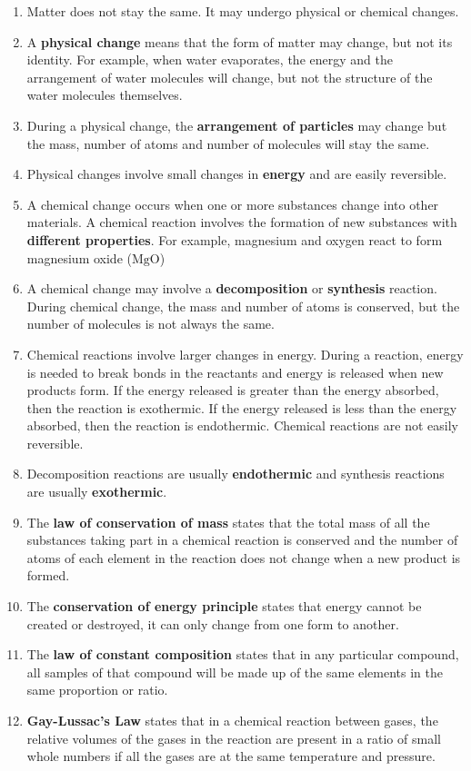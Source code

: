       \label{m38711*id65342}\begin{enumerate}[noitemsep, label=\textbf{\arabic*}. ] 
            \label{m38711*uid40}\item Matter does not stay the same. It may undergo physical or chemical changes.
\label{m38711*uid41}\item A \textbf{physical change} means that the form of matter may change, but not its identity. For example, when water evaporates, the energy and the arrangement of water molecules will change, but not the structure of the water molecules themselves.
\label{m38711*uid42}\item During a physical change, the \textbf{arrangement of particles} may change but the mass, number of atoms and number of molecules will stay the same.
\label{m38711*uid43}\item Physical changes involve small changes in \textbf{energy} and are easily reversible.
\label{m38711*uid44}\item A chemical change occurs when one or more substances change into other materials. A chemical reaction involves the formation of new substances with \textbf{different properties}. For example, magnesium and oxygen react to form magnesium oxide ($\mathrm{MgO}$) \label{m38711*uid45}\item A chemical change may involve a \textbf{decomposition} or \textbf{synthesis} reaction. During chemical change, the mass and number of atoms is conserved, but the number of molecules is not always the same.
\label{m38711*uid46}\item Chemical reactions involve larger changes in energy. During a reaction, energy is needed to break bonds in the reactants and energy is released when new products form. If the energy released is greater than the energy absorbed, then the reaction is exothermic. If the energy released is less than the energy absorbed, then the reaction is endothermic. Chemical reactions are not easily reversible.
\label{m38711*uid47}\item Decomposition reactions are usually \textbf{endothermic} and synthesis reactions are usually \textbf{exothermic}.
\label{m38711*uid48}\item The \textbf{law of conservation of mass} states that the total mass of all the substances taking part in a chemical reaction is conserved and the number of atoms of each element in the reaction does not change when a new product is formed.
\label{m38711*uid49}\item The \textbf{conservation of energy principle} states that energy cannot be created or destroyed, it can only change from one form to another.
\label{m38711*uid50}\item The \textbf{law of constant composition} states that in any particular compound, all samples of that compound will be made up of the same elements in the same proportion or ratio.
\label{m38711*uid51}\item \textbf{Gay-Lussac's Law} states that in a chemical reaction between gases, the relative volumes of the gases in the reaction are present in a ratio of small whole numbers if all the gases are at the same temperature and pressure.
\end{enumerate}
